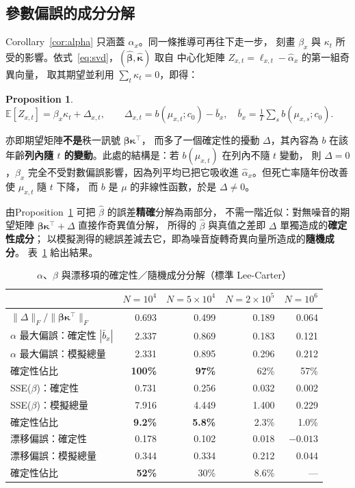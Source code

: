 \documentclass[UTF8, fontset=macnew, a4paper, 12pt]{ctexart}
\newtheorem{prop}{Proposition}
\newcommand{\Ex}{\mathbb{E}}
\begin{document}
\subsection{參數偏誤的成分分解}\label{sec:betadec}

Corollary~\ref{cor:alpha} 只涵蓋 $\alpha_x$。同一條推導可再往下走一步，
刻畫 $\beta_x$ 與 $\kappa_t$ 所受的影響。依式~\eqref{eq:svd}，$(\hat{\boldsymbol\beta},\hat{\boldsymbol\kappa})$ 取自
中心化矩陣 $Z_{x,t}=\ell_{x,t}-\hat\alpha_x$ 的第一組奇異向量，
取其期望並利用 $\sum_t\kappa_t=0$，即得：

\begin{prop}\label{prop:beta}
$\displaystyle \Ex[Z_{x,t}]=\beta_x\kappa_t+\Delta_{x,t},\qquad
\Delta_{x,t}=b(\mu_{x,t};c_0)-\bar b_x,\quad
\bar b_x=\frac1T\sum_s b(\mu_{x,s};c_0).$
\end{prop}

亦即期望矩陣\textbf{不是}秩一訊號 $\boldsymbol\beta\boldsymbol\kappa^{\top}$，
而多了一個確定性的擾動 $\Delta$，其內容為 $b$ 在該年齡\textbf{列內隨 $t$
的變動}。此處的結構是：若 $b(\mu_{x,t})$ 在列內不隨 $t$ 變動，
則 $\Delta=0$，$\beta_x$ 完全不受對數偏誤影響，因為列平均已把它吸收進
$\hat\alpha_x$。但死亡率隨年份改善使 $\mu_{x,t}$ 隨 $t$ 下降，
而 $b$ 是 $\mu$ 的非線性函數，於是 $\Delta\ne0$。

由Proposition~\ref{prop:beta} 可把 $\hat\beta$ 的誤差\textbf{精確}分解為兩部分，
不需一階近似：對無噪音的期望矩陣
$\boldsymbol\beta\boldsymbol\kappa^{\top}+\Delta$ 直接作奇異值分解，
所得的 $\hat\beta$ 與真值之差即 $\Delta$ 單獨造成的\textbf{確定性成分}；
以模擬測得的總誤差減去它，即為噪音旋轉奇異向量所造成的\textbf{隨機成分}。
表~\ref{tab:betadec} 給出結果。

\begin{table}[H]
\centering
\caption{$\alpha$、$\beta$ 與漂移項的確定性／隨機成分分解（標準 Lee-Carter）}
\footnotesize
\begin{tabular}{lrrrr}
\toprule
 & $N=10^4$ & $N=5\times10^4$ & $N=2\times10^5$ & $N=10^6$\\
\midrule
$\|\Delta\|_F/\|\boldsymbol\beta\boldsymbol\kappa^{\top}\|_F$
 & 0.693 & 0.499 & 0.189 & 0.064\\
\midrule
$\alpha$ 最大偏誤：確定性 $|\bar b_x|$ & 2.337 & 0.869 & 0.183 & 0.121\\
$\alpha$ 最大偏誤：模擬總量 & 2.331 & 0.895 & 0.296 & 0.212\\
\quad 確定性佔比 & \textbf{100\%} & \textbf{97\%} & 62\% & 57\%\\
\midrule
SSE($\beta$)：確定性 & 0.731 & 0.256 & 0.032 & 0.002\\
SSE($\beta$)：模擬總量 & 7.916 & 4.449 & 1.400 & 0.229\\
\quad 確定性佔比 & \textbf{9.2\%} & \textbf{5.8\%} & 2.3\% & 1.0\%\\
\midrule
漂移偏誤：確定性 & 0.178 & 0.102 & 0.018 & $-0.013$\\
漂移偏誤：模擬總量 & 0.344 & 0.334 & 0.212 & 0.044\\
\quad 確定性佔比 & \textbf{52\%} & 30\% & 8.6\% & ---\\
\bottomrule
\end{tabular}
\label{tab:betadec}
\end{table}
\end{document}

